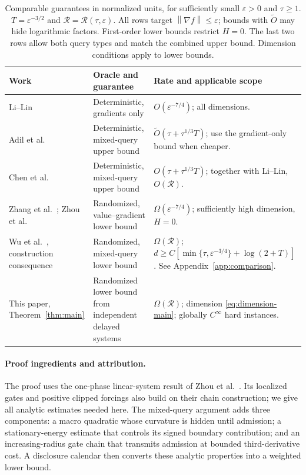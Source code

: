 \documentclass[11pt]{article}
\theoremstyle{definition}
\theoremstyle{remark}
\newcommand{\eps}{\varepsilon}
\newcommand{\norm}[1]{\left\|#1\right\|}
\newcommand{\Rate}{\mathcal R}
\begin{document}
\begin{table}[t]
\centering
\small
\setlength{\tabcolsep}{5pt}
\renewcommand{\arraystretch}{1.18}
\caption{Comparable guarantees in normalized units, for sufficiently
small $\eps>0$ and $\tau\ge1$.
$T=\eps^{-3/2}$ and $\Rate=\Rate(\tau,\eps)$.
All rows target $\norm{\nabla f}\le\eps$; bounds with $\widetilde O$
may hide logarithmic factors. First-order lower bounds restrict $H=0$.
The last two rows allow both query types and match the combined upper
bound. Dimension conditions apply to lower bounds.}
\label{tab:literature}
\begin{tabularx}{\textwidth}{@{}p{}p{}Y@{}}
\toprule
Work & Oracle and guarantee & Rate and applicable scope\\
\midrule
Li--Lin \cite{lilin}
& Deterministic, gradients only
& $O(\eps^{-7/4})$; all dimensions.\\
Adil et al.\ \cite{adil}
& Deterministic, mixed-query upper bound
& $\widetilde O(\tau+\tau^{1/3}T)$; use the gradient-only bound when cheaper.\\
Chen et al.\ \cite{chen}
& Deterministic, mixed-query upper bound
& $O(\tau+\tau^{1/3}T)$; together with Li--Lin, $O(\Rate)$.\\
Zhang et al.\ \cite{zhang}; Zhou et al.\ \cite{zhou}
& Randomized, value--gradient lower bound
& $\Omega(\eps^{-7/4})$; sufficiently high dimension, $H=0$.\\
\midrule
Wu et al.\ \cite{wu}, construction consequence
& Randomized, mixed-query lower bound
& $\Omega(\Rate)$; $d\ge C[\min\{\tau,\eps^{-3/4}\}+\log(2+T)]$. See Appendix~\ref{app:comparison}.\\
This paper, Theorem~\ref{thm:main}
& Randomized lower bound from independent delayed systems
& $\Omega(\Rate)$; dimension \eqref{eq:dimension-main}; globally $C^\infty$ hard instances.\\
\bottomrule
\end{tabularx}
\end{table}

\paragraph{Proof ingredients and attribution.}
The proof uses the one-phase linear-system result of Zhou et al.\
\cite[Lemma 6.9]{zhou}. Its localized gates and positive clipped forcings
also build on their chain construction; we give all analytic estimates
needed here. The mixed-query argument adds three components: a macro
quadratic whose curvature is hidden until admission; a stationary-energy
estimate that controls its signed boundary contribution; and an
increasing-radius gate chain that transmits admission at bounded
third-derivative cost. A disclosure calendar then converts these analytic
properties into a weighted lower bound.
\end{document}
